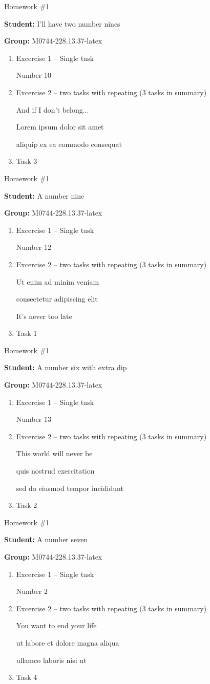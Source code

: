 \documentclass[12pt, fleqn, a4paper]{article}
\newcommand{\preamble}{\lipsum[1]}
\newcommand{\generatepage}[4]{
	\begin{center}
		{\Large #1}

		\textbf{Student:} #2

		\textbf{Group:} #3

	\end{center}

	\vspace{10pt}

	\preamble

	\begin{enumerate}
		#4
	\end{enumerate}

	\pagebreak
}
\begin{document}
	\generatepage{Homework \#1}{I'll have two number nines}{M0744-228.13.37-latex}{
		\item Excercise 1 -- Single task

			Number 10
		\item Excercise 2 -- two tasks with repeating (3 tasks in summary)

			And if I don't belong...

			Lorem ipsum dolor sit amet

			aliquip ex ea commodo consequat
		\item 

			Task 3
	}

	\generatepage{Homework \#1}{{\large A number nine}}{M0744-228.13.37-latex}{
		\item Excercise 1 -- Single task

			Number 12
		\item Excercise 2 -- two tasks with repeating (3 tasks in summary)

			Ut enim ad minim veniam

			consectetur adipiscing elit

			It's never too late
		\item 

			Task 1
	}

	\generatepage{Homework \#1}{A number six with extra dip}{M0744-228.13.37-latex}{
		\item Excercise 1 -- Single task

			Number 13
		\item Excercise 2 -- two tasks with repeating (3 tasks in summary)

			This world will never be

			quis nostrud exercitation 

			sed do eiusmod tempor incididunt 
		\item 

			Task 2
	}

	\generatepage{Homework \#1}{A number seven}{M0744-228.13.37-latex}{
		\item Excercise 1 -- Single task

			Number 2
		\item Excercise 2 -- two tasks with repeating (3 tasks in summary)

			You want to end your life

			ut labore et dolore magna aliqua 

			ullamco laboris nisi ut 
		\item 

			Task 4
	}
\end{document}
